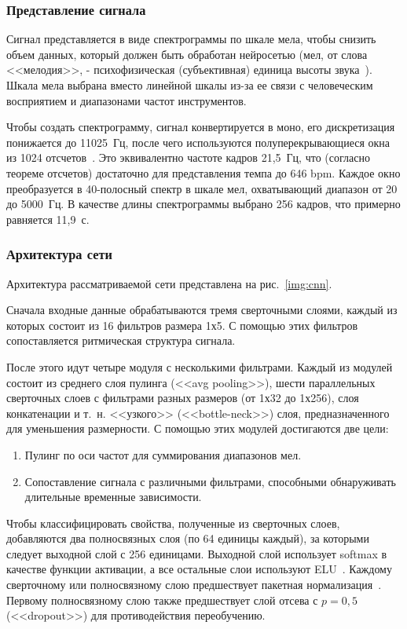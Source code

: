 \subsubsection{Представление сигнала}

Сигнал представляется в виде спектрограммы по шкале мела, чтобы снизить объем данных, который должен быть обработан нейросетью (мел, от слова <<мелодия>>, - психофизическая (субъективная) единица высоты звука~\cite{mels}). Шкала мела выбрана вместо линейной шкалы из-за ее связи с человеческим восприятием и диапазонами частот инструментов.

Чтобы создать спектрограмму, сигнал конвертируется в моно, его дискретизация понижается до 11025~Гц, после чего используются полуперекрывающиеся окна из 1024 отсчетов~\cite{cnn}. Это эквивалентно частоте кадров 21,5~Гц, что (согласно теореме отсчетов) достаточно для представления темпа до 646 bpm. Каждое окно преобразуется в 40-полосный спектр в шкале мел, охватывающий диапазон от 20 до 5000~Гц. В качестве длины спектрограммы выбрано 256 кадров, что примерно равняется 11,9~с.

\subsubsection{Архитектура сети}

Архитектура рассматриваемой сети представлена на рис.~\ref{img:cnn}.

Сначала входные данные обрабатываются тремя сверточными слоями, каждый из которых состоит из 16 фильтров размера 1х5. С помощью этих фильтров сопоставляется ритмическая структура сигнала.

После этого идут четыре модуля с несколькими фильтрами. Каждый из модулей состоит из среднего слоя пулинга (<<avg pooling>>), шести параллельных сверточных слоев с фильтрами разных размеров (от 1х32 до 1х256), слоя конкатенации и т.~н. <<узкого>> (<<bottle-neck>>) слоя, предназначенного для уменьшения размерности. С помощью этих модулей достигаются две цели:

\begin{enumerate} 
	\item Пулинг по оси частот для суммирования диапазонов мел.
	\item Сопоставление сигнала с различными фильтрами, способными обнаруживать длительные временные зависимости.
\end{enumerate}

Чтобы классифицировать свойства, полученные из сверточных слоев, добавляются два полносвязных слоя (по 64 единицы каждый), за которыми следует выходной слой с 256 единицами. Выходной слой использует softmax в качестве функции активации, а все остальные слои используют ELU~\cite{elu}. Каждому сверточному или полносвязному слою предшествует пакетная нормализация~\cite{batch}. Первому полносвязному слою также предшествует слой отсева с $p = 0,5$ (<<dropout>>) для противодействия переобучению.

